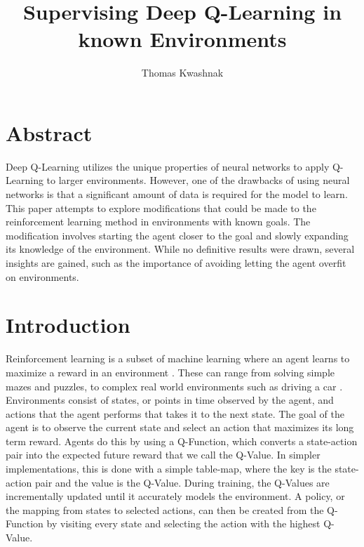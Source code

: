 \documentclass[12pt,letterpaper]{article}
\author{Thomas Kwashnak}
\title{Supervising Deep Q-Learning in known Environments}
\begin{document}
\maketitle

\newpage

\section{Abstract}

Deep Q-Learning utilizes the unique properties of neural networks to apply Q-Learning to larger environments.
However, one of the drawbacks of using neural networks is that a significant amount of data is required for the model to learn.
This paper attempts to explore modifications that could be made to the reinforcement learning method in environments with known goals.
The modification involves starting the agent closer to the goal and slowly expanding its knowledge of the environment.
While no definitive results were drawn, several insights are gained, such as the importance of avoiding letting the agent overfit on environments.

\section{Introduction}

Reinforcement learning is a subset of machine learning where an agent learns to maximize a reward in an environment \cite{article_reinforcement_learning_survey}.
These can range from solving simple mazes and puzzles, to complex real world environments such as driving a car \cite{article_deep_learning_hybrid_quantum}.
Environments consist of states, or points in time observed by the agent, and actions that the agent performs that takes it to the next state.
The goal of the agent is to observe the current state and select an action that maximizes its long term reward.
Agents do this by using a Q-Function, which converts a state-action pair into the expected future reward that we call the Q-Value.
In simpler implementations, this is done with a simple table-map, where the key is the state-action pair and the value is the Q-Value.
During training, the Q-Values are incrementally updated until it accurately models the environment.
A policy, or the mapping from states to selected actions, can then be created from the Q-Function by visiting every state and selecting the action with the highest Q-Value.
\end{document}
